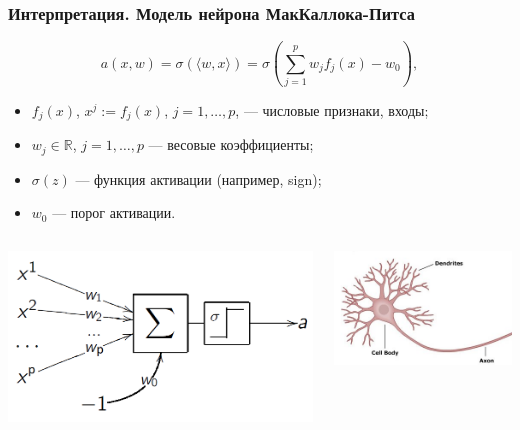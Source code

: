 \documentclass[10pt]{beamer}
\begin{document}
\begin{frame}
\frametitle{Интерпретация. Модель нейрона МакКаллока-Питса}
\begin{equation*}
a(x, w) = \sigma( \langle w,x \rangle ) = \sigma\left(\sum_{j=1}^{p} w_j f_j(x) - w_0 \right),
\end{equation*}

\begin{itemize}
\item $f_j(x)$, $x^j:= f_j(x)$, $j=1,\ldots,p$, --- числовые признаки, входы;
\item $w_j \in \mathbb{R}$, $j=1,\ldots,p$ --- весовые коэффициенты; 
\item $\sigma(z)$ --- функция активации (например, sign);
\item $w_0$ --- порог активации.

\end{itemize}
 \begin{columns}
   \begin{center}
	\includegraphics[scale=0.3]{mp2}
	\end{center}
\begin{center}
	\includegraphics[scale=0.4]{neuron}
	\end{center}
\end{columns} 
\end{frame}
\end{document}

